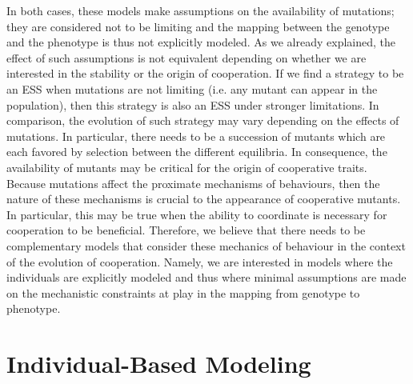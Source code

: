             In both cases, these models make assumptions on the availability of mutations; they are considered not to be limiting and the mapping between the genotype and the phenotype is thus not explicitly modeled. As we already explained, the effect of such assumptions is not equivalent depending on whether we are interested in the stability or the origin of cooperation. If we find a strategy to be an ESS when mutations are not limiting (i.e. any mutant can appear in the population), then this strategy is also an ESS under stronger limitations. In comparison, the evolution of such strategy may vary depending on the effects of mutations. In particular, there needs to be a succession of mutants which are each favored by selection between the different equilibria. In consequence, the availability of mutants may be critical for the origin of cooperative traits. Because mutations affect the proximate mechanisms of behaviours, then the nature of these mechanisms is crucial to the appearance of cooperative mutants. In particular, this may be true when the ability to coordinate is necessary for cooperation to be beneficial. Therefore, we believe that there needs to be complementary models that consider these mechanics of behaviour in the context of the evolution of cooperation. Namely, we are interested in models where the individuals are explicitly modeled and thus where minimal assumptions are made on the mechanistic constraints at play in the mapping from genotype to phenotype.



\section{Individual-Based Modeling}

